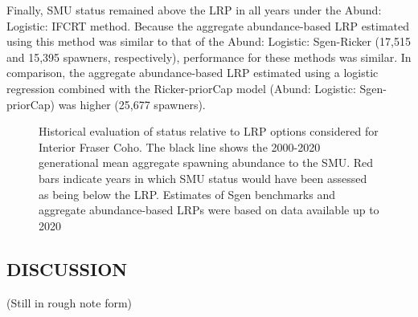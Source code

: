 \documentclass[11pt]{book}
\begin{document}
Finally, SMU status remained above the LRP in all years under the Abund: Logistic: IFCRT method. Because the aggregate abundance-based LRP estimated using this method was similar to that of the Abund: Logistic: Sgen-Ricker (17,515 and 15,395 spawners, respectively), performance for these methods was similar. In comparison, the aggregate abundance-based LRP estimated using a logistic regression combined with the Ricker-priorCap model (Abund: Logistic: Sgen-priorCap) was higher (25,677 spawners).
\begin{figure}[htb]

{\centering {} 

}

\caption{Historical evaluation of status relative to LRP options considered for Interior Fraser Coho. The black line shows the 2000-2020 generational mean aggregate spawning abundance to the SMU. Red bars indicate years in which SMU status would have been assessed as being below the LRP. Estimates of Sgen benchmarks and aggregate abundance-based LRPs were based on data available up to 2020}\label{fig:coho-statusPlot-withBars}
\end{figure}
\hypertarget{discussion}{%
\subsection{DISCUSSION}\label{discussion}}

(Still in rough note form)
\end{document}
